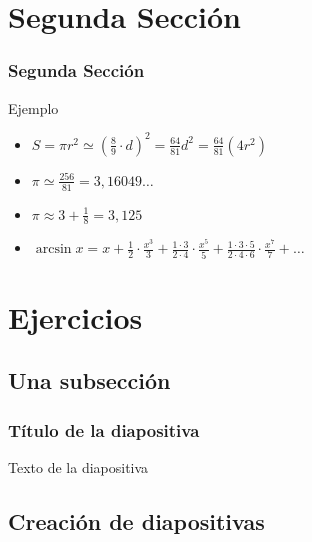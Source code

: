 \documentclass{beamer}
\begin{document}
\section{Segunda Sección}

\begin{frame}

\frametitle{Segunda Sección}

\begin{block}{Ejemplo}
  \begin{itemize}
  \item
    $S = \pi r^2 \simeq \left ( \frac{8}{9} \cdot d \right )^2 = \frac{64}{81} d^2 = \frac{64}{81} \left(4 r^2\right) $
  \pause

  \item
    $\pi \simeq \frac{256}{81} = 3{,}16049 \ldots $
  \pause

  \item
    $\pi \approx 3 + \frac{1}{8} = 3,125 $
  \pause
  
  \item
    $
    \arcsin {x} = x + \frac{1}{2} \cdot \frac {x^3}{3} + \frac{1 \cdot 3}{2\cdot 4} \cdot \frac {x^5}{5} + \frac{1\cdot 3\cdot 5}{2\cdot 4\cdot 6} \cdot \frac{x^7}{7} + \ldots $

  \end{itemize}
\end{block}

\end{frame}

\section{Ejercicios}

\subsection{Una subsección}
\begin{frame}
\frametitle{Título de la diapositiva}

Texto de la diapositiva
\end{frame}

\subsection{Creación de diapositivas}
\end{document}
